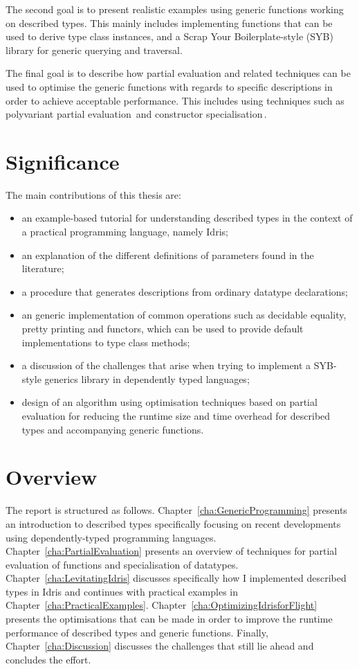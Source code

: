 \documentclass{ituthesis}
\theoremstyle{break}
\begin{document}
The second goal is to present realistic examples using generic functions working on described types. 
This mainly includes implementing functions that can be used to derive type class instances, and a Scrap Your Boilerplate-style (SYB) library for generic querying and traversal.

The final goal is to describe how partial evaluation and related techniques can be used to optimise the generic functions with regards to specific descriptions in order to achieve acceptable performance.
This includes using techniques such as polyvariant partial evaluation\,\autocite{Jones:1993:PEA:153676} and constructor specialisation\,\autocite{Mogensen:1993:CS:154630.154633}. %

\section{Significance}
\label{sec:Significance}
The main contributions of this thesis are:

\begin{itemize}
  \item an example-based tutorial for understanding described types in the context of a practical programming language, namely Idris;
    \item an explanation of the different definitions of parameters found in the literature;
    \item a procedure that generates descriptions from ordinary datatype declarations;
  \item an generic implementation of common operations such as decidable equality, pretty printing and functors, which can be used to provide default implementations to type class methods;
  \item a discussion of the challenges that arise when trying to implement a SYB-style generics library in dependently typed languages;
  \item design of an algorithm using optimisation techniques based on partial evaluation for reducing the runtime size and time overhead for described types and accompanying generic functions.
\end{itemize}
\section{Overview}
\label{sec:Overview}

The report is structured as follows. Chapter~\ref{cha:GenericProgramming} presents an introduction to described types specifically focusing on recent developments using dependently-typed programming languages.
Chapter~\ref{cha:PartialEvaluation} presents an overview of techniques for partial evaluation of functions and specialisation of datatypes. Chapter~\ref{cha:LevitatingIdris} discusses specifically how I implemented described types in Idris and continues with practical examples in Chapter~\ref{cha:PracticalExamples}.
Chapter~\ref{cha:OptimizingIdrisforFlight} presents the optimisations that can be made in order to improve the runtime performance of described types and generic functions.
Finally, Chapter~\ref{cha:Discussion} discusses the challenges that still lie ahead and concludes the effort.
\end{document}
